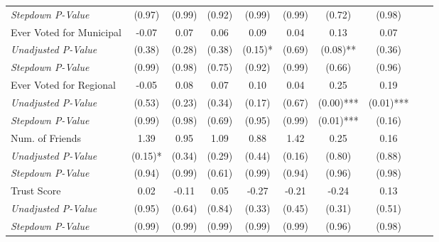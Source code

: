 \begin{tabular}{l c c c c c c c c c}
\quad \textit{Stepdown P-Value} & (0.97) & (0.99) & (0.92) & (0.99) & (0.99) & (0.72) & (0.98) \\
Ever Voted for Municipal & -0.07 & 0.07 & 0.06 & 0.09 & 0.04 & 0.13 & 0.07 \\
\quad \textit{Unadjusted P-Value} & (0.38) & (0.28) & (0.38) & (0.15)* & (0.69) & (0.08)** & (0.36) \\
\quad \textit{Stepdown P-Value} & (0.99) & (0.98) & (0.75) & (0.92) & (0.99) & (0.66) & (0.96) \\
Ever Voted for Regional & -0.05 & 0.08 & 0.07 & 0.10 & 0.04 & 0.25 & 0.19 \\
\quad \textit{Unadjusted P-Value} & (0.53) & (0.23) & (0.34) & (0.17) & (0.67) & (0.00)*** & (0.01)*** \\
\quad \textit{Stepdown P-Value} & (0.99) & (0.98) & (0.69) & (0.95) & (0.99) & (0.01)*** & (0.16) \\
Num. of Friends & 1.39 & 0.95 & 1.09 & 0.88 & 1.42 & 0.25 & 0.16 \\
\quad \textit{Unadjusted P-Value} & (0.15)* & (0.34) & (0.29) & (0.44) & (0.16) & (0.80) & (0.88) \\
\quad \textit{Stepdown P-Value} & (0.94) & (0.99) & (0.61) & (0.99) & (0.94) & (0.96) & (0.98) \\
Trust Score & 0.02 & -0.11 & 0.05 & -0.27 & -0.21 & -0.24 & 0.13 \\
\quad \textit{Unadjusted P-Value} & (0.95) & (0.64) & (0.84) & (0.33) & (0.45) & (0.31) & (0.51) \\
\quad \textit{Stepdown P-Value} & (0.99) & (0.99) & (0.99) & (0.99) & (0.99) & (0.96) & (0.98) \\
\bottomrule
\end{tabular}
